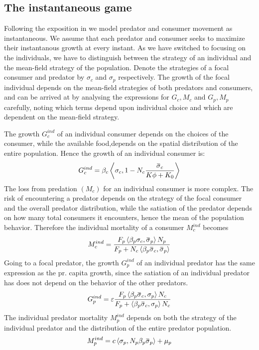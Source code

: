 \subsection{The instantaneous game}
Following the exposition in  we model predator and consumer movement as instantaneous. We assume that each predator and consumer seeks to maximize their instantanous growth at every instant. As we have switched to focusing on the individuals, we have to distinguish between the strategy of an individual and the mean-field strategy of the population. Denote the strategies of a focal consumer and predator by $\sigma_c$ and $\sigma_p$ respectively.  The growth of the focal individual depends on the mean-field strategies of both predators and consumers, and can be arrived at by analysing the expressions for $G_c,M_c$ and $G_p, M_p$ carefully, noting which terms depend upon individual choice and which are dependent on the mean-field strategy.


The growth $G_c^{ind}$ of an individual consumer depends on the choices of the consumer, while the available food,depends on the spatial distribution of the entire population. Hence the growth of an individual consumer is:
\begin{equation}
  G_c^{ind} = \beta_c\ip{\sigma_c}{1-N_c \frac{\overbar{\sigma}_c}{K\phi + K_0}}
\end{equation}
The loss from predation $(M_c)$ for an individual consumer is more complex. The risk of encountering a predator depends on the strategy of the focal consumer and the overall predator distribution, while the satiation of the predator depends on how many total consumers it encounters, hence the mean of the population behavior. Therefore the individual mortality of a consumer $M_c^{ind}$ becomes
\begin{equation}
  M_c^{ind} =  \frac{F_p \ip{\beta_p \sigma_c}{\overbar{\sigma}_p} N_p}{F_p + N_c\ip{\beta_p \overbar{\sigma}_c}{\overbar{\sigma}_p}}
\end{equation}
Going to a focal predator, the growth $G_p^{ind}$ of an individual predator has the same expression as the pr. capita growth, since the satiation of an individual predator has does not depend on the behavior of the other predators.
\begin{equation}
  G_p^{ind} = \epsilon \frac{F_p \ip{\beta_p \overbar{\sigma}_c}{\sigma_p} N_c}{F_p + \ip{\beta_p \overbar{\sigma}_c}{\sigma_p} N_c}
\end{equation}
The individual predator mortality $M_p^{ind}$ depends on both the strategy of the individual predator and the distribution of the entire predator population.
\begin{equation}
  M_p^{ind} =  c \ip{\sigma_p}{N_p\beta_p \overbar{\sigma}_p}  + \mu_p
\end{equation}

